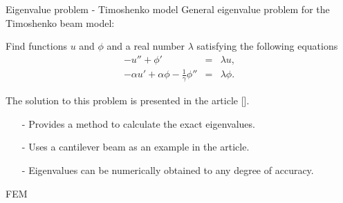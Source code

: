 \documentclass[8pt]{beamer}
\begin{document}
        \begin{frame}{Eigenvalue problem - Timoshenko model}
            General eigenvalue problem for the Timoshenko beam model:
        
            Find functions $u$ and $\phi$ and a real number $\lambda$ satisfying the following equations
            \begin{eqnarray}
            -u'' + \phi' &=& \lambda u, \label{eq:Timo:EigenvalueProblem1}\\
            -\alpha u' + \alpha\phi - \frac{1}{\gamma}\phi'' &=& \lambda\phi.\label{eq:Timo:EigenvalueProblem2}
            \end{eqnarray}
        
            The solution to this problem is presented in the article [\cite{VV06}].
        
            \begin{itemize}
                \item[-] Provides a method to calculate the exact eigenvalues.
                \item[-] Uses a cantilever beam as an example in the article.
                \item[-] Eigenvalues can be numerically obtained to any degree of accuracy.
            \end{itemize}
        
        \end{frame}

        \begin{frame}{FEM}
        \end{frame}
\end{document}
